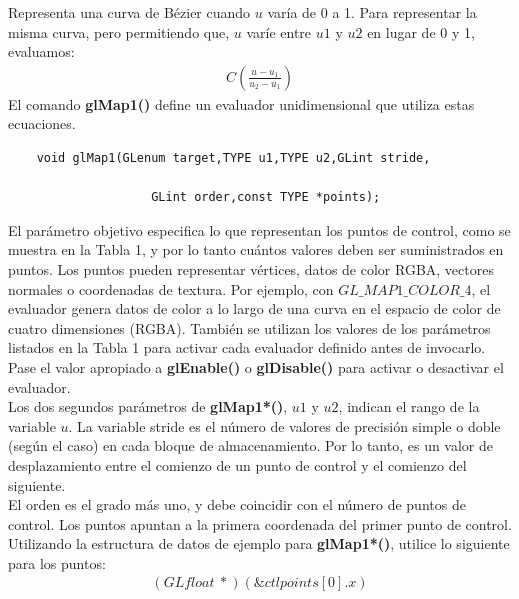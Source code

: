Representa una curva de Bézier cuando $u$ varía de 0 a 1. Para representar la misma curva, pero permitiendo que, $u$ varíe entre $u1$ y $u2$ en lugar de 0 y 1, evaluamos:
\begin{align*}
C\left(\frac{u-u_1}{u_2-u_1}\right)
\end{align*}
El comando \textbf{glMap1()} define un evaluador unidimensional que utiliza estas ecuaciones.\\

\begin{lstlisting}
    void glMap1(GLenum target,TYPE u1,TYPE u2,GLint stride,

                    GLint order,const TYPE *points);
\end{lstlisting}
El parámetro objetivo especifica lo que representan los puntos de control, como se muestra en la Tabla 1, y por lo tanto cuántos valores deben ser suministrados en puntos. Los puntos pueden representar vértices, datos de color RGBA, vectores normales o coordenadas de textura. Por ejemplo, con \textbf{$GL\_MAP1\_COLOR\_4$}, el evaluador genera datos de color a lo largo de una curva en el espacio de color de cuatro dimensiones (RGBA). También se utilizan los valores de los parámetros listados en la Tabla 1 para activar cada evaluador definido antes de invocarlo. Pase el valor apropiado a \textbf{glEnable()} o \textbf{glDisable()} para activar o desactivar el evaluador.\\

Los dos segundos parámetros de \textbf{glMap1*()}, $u1$ y $u2$, indican el rango de la variable $u$. La variable stride es el número de valores de precisión simple o doble (según el caso) en cada bloque de almacenamiento. Por lo tanto, es un valor de desplazamiento entre el comienzo de un punto de control y el comienzo del siguiente. \\

El orden es el grado más uno, y debe coincidir con el número de puntos de control. Los puntos apuntan a la primera coordenada del primer punto de control. Utilizando la estructura de datos de ejemplo para \textbf{glMap1*()}, utilice lo siguiente para los puntos:
\begin{align*}
(GLfloat \ *) (\&ctlpoints[0].x)
\end{align*}

